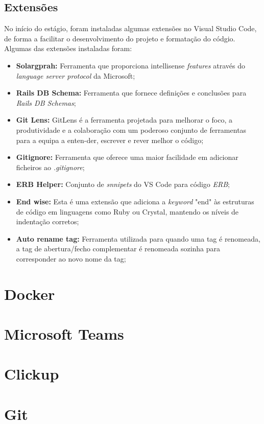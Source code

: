     \newpage
    \subsection{Extensões}
        No início do estágio, foram instaladas algumas extensões no Visual Studio Code, de forma a facilitar o desenvolvimento do projeto e formatação do códgio. Algumas das extensões instaladas foram:
        \begin{itemize}[noitemsep, topsep=0pt]
            \item \textbf{Solargprah:} Ferramenta que proporciona intellisense \textit{features} através do \textit{language server protocol} da Microsoft;
            \item \textbf{Rails DB Schema:} Ferramenta que fornece definições e conclusões para \textit{Rails DB Schemas};
            \item \textbf{Git Lens:} GitLens é a ferramenta projetada para melhorar o foco, a produtividade e a colaboração com um poderoso conjunto de ferramentas para a equipa a enten-der, escrever e rever melhor o código;
            \item \textbf{Gitignore:} Ferramenta que oferece uma maior facilidade em adicionar ficheiros ao \textit{.gitignore};
            \item \textbf{ERB Helper:} Conjunto de \textit{snnipets} do VS Code para código \textit{ERB};
            \item \textbf{End wise:} Esta é uma extensão que adiciona a \textit{keyword} "end" às estruturas de código em linguagens como Ruby ou Crystal, mantendo os níveis de indentação corretos;
            \item \textbf{Auto rename tag:} Ferramenta utilizada para quando uma tag é renomeada, a tag de abertura/fecho complementar é renomeada sozinha para corresponder ao novo nome da tag;
        \end{itemize}

\section{Docker}
\section{Microsoft Teams}
\section{Clickup}
\section{Git}
